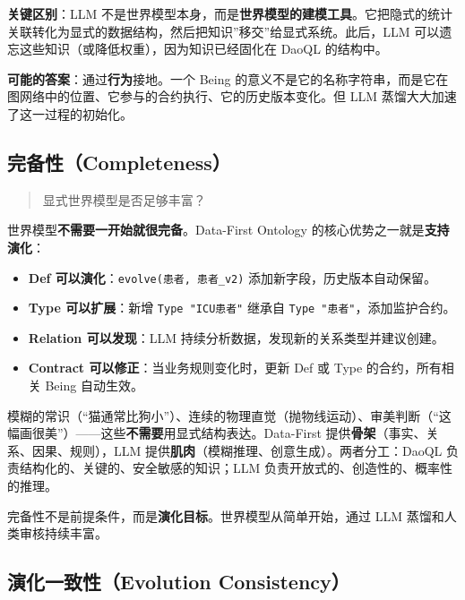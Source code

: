 \documentclass[11pt,a4paper]{ctexart}
\begin{document}
\textbf{关键区别}：LLM
不是世界模型本身，而是\textbf{世界模型的建模工具}。它把隐式的统计关联转化为显式的数据结构，然后把知识''移交''给显式系统。此后，LLM
可以遗忘这些知识（或降低权重），因为知识已经固化在 DaoQL 的结构中。

\textbf{可能的答案}：通过\textbf{行为}接地。一个 Being
的意义不是它的名称字符串，而是它在图网络中的位置、它参与的合约执行、它的历史版本变化。但
LLM 蒸馏大大加速了这一过程的初始化。

\subsection{完备性（Completeness）}\label{ux5b8cux5907ux6027completeness}

\begin{quote}
显式世界模型是否足够丰富？
\end{quote}

世界模型\textbf{不需要一开始就很完备}。Data-First Ontology
的核心优势之一就是\textbf{支持演化}：

\begin{itemize}
\tightlist
\item
  \textbf{Def 可以演化}：\texttt{evolve(患者,\ 患者\_v2)}
  添加新字段，历史版本自动保留。
\item
  \textbf{Type 可以扩展}：新增 \texttt{Type\ "ICU患者"} 继承自
  \texttt{Type\ "患者"}，添加监护合约。
\item
  \textbf{Relation 可以发现}：LLM
  持续分析数据，发现新的关系类型并建议创建。
\item
  \textbf{Contract 可以修正}：当业务规则变化时，更新 Def 或 Type
  的合约，所有相关 Being 自动生效。
\end{itemize}

模糊的常识（``猫通常比狗小''）、连续的物理直觉（抛物线运动）、审美判断（``这幅画很美''）------这些\textbf{不需要}用显式结构表达。Data-First
提供\textbf{骨架}（事实、关系、因果、规则），LLM
提供\textbf{肌肉}（模糊推理、创意生成）。两者分工：DaoQL
负责结构化的、关键的、安全敏感的知识；LLM
负责开放式的、创造性的、概率性的推理。

完备性不是前提条件，而是\textbf{演化目标}。世界模型从简单开始，通过 LLM
蒸馏和人类审核持续丰富。

\subsection{演化一致性（Evolution
Consistency）}\label{ux6f14ux5316ux4e00ux81f4ux6027evolution-consistency}
\end{document}
